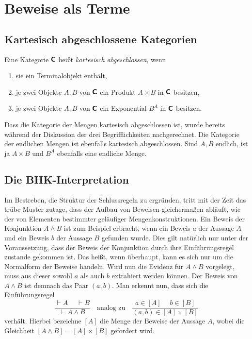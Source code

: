 \newpage
\section{Beweise als Terme}

\subsection{Kartesisch abgeschlossene Kategorien}

\begin{Definition}\newlinefirst
Eine Kategorie $\textsf{\textbf{C}}$ heißt \emph{kartesisch abgeschlossen},
wenn
\begin{enumerate}[nosep]
\item sie ein Terminalobjekt enthält,
\item je zwei Objekte $A,B$ von $\textsf{\textbf{C}}$ ein Produkt
  $A\times B$ in $\textsf{\textbf{C}}$ besitzen,
\item je zwei Objekte $A,B$ von $\textsf{\textbf{C}}$ ein Exponential
  $B^A$ in $\textsf{\textbf{C}}$ besitzen.
\end{enumerate}
\end{Definition}

\noindent
Dass die Kategorie der Mengen kartesisch abgeschlossen ist, wurde
bereits während der Diskussion der drei Begrifflichkeiten
nachgerechnet. Die Kategorie der endlichen Mengen ist ebenfalls
kartesisch abgeschlossen. Sind $A,B$ endlich, ist ja $A\times B$
und $B^A$ ebenfalls eine endliche Menge.

\subsection{Die BHK-Interpretation}

Im Bestreben, die Struktur der Schlussregeln zu ergründen, tritt
mit der Zeit das trübe Muster zutage, dass der Aufbau von Beweisen
gleichermaßen abläuft, wie der von Elementen bestimmter geläufiger
Mengenkonstruktionen. Ein Beweis der Konjunktion $A\land B$ ist
zum Beispiel erbracht, wenn ein Beweis $a$ der Aussage $A$ und
ein Beweis $b$ der Aussage $B$ gefunden wurde. Dies gilt natürlich
nur unter der Voraussetzung, dass der Beweis der Konjunktion durch ihre
Einführungsregel zustande gekommen ist. Das heißt, wenn überhaupt,
kann es sich nur um die Normalform der Beweise handeln. Wird nun die
Evidenz für $A\land B$ vorgelegt, muss aus dieser sowohl $a$ als auch
$b$ extrahiert werden können. Der Beweis von $A\land B$ ist demnach
das Paar $(a,b)$. Man erkennt nun, dass sich die Einführungsregel
\[\dfrac{\vdash A\quad\;\vdash B}{\vdash A\land B}\quad\text{analog zu}\quad
\dfrac{a\in [A]\quad\; b\in [B]}{(a,b)\in [A]\times [B]}\]
verhält. Hierbei bezeichne $[A]$ die Menge der Beweise der Aussage $A$,
wobei die Gleichheit $[A\land B] = [A]\times [B]$ gefordert wird.

